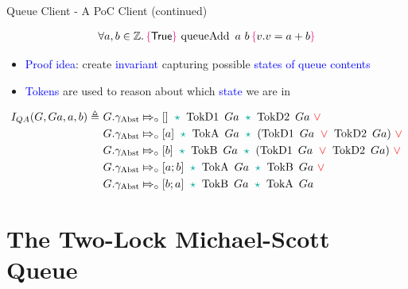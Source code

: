 \documentclass[9pt,xcolor={dvipsnames}]{beamer}
\newcommand{\queueAdd}{\operatorname{queueAdd}}
\newcommand{\QueueAddInvariant}{I_{QA}}
\newcommand{\Qg}{G}
\newcommand{\QAg}{Ga}
\newcommand{\gabst}{\gname_{\mathrm{Abst}}}
\newcommand{\TokDo}[1]{\operatorname{TokD1} ~ #1}
\newcommand{\TokDoQAg}{\TokDo{\QAg}}
\newcommand{\TokDt}[1]{\operatorname{TokD2} ~ #1}
\newcommand{\TokDtQAg}{\TokDt{\QAg}}
\newcommand{\TokA}[1]{\operatorname{TokA} ~ #1}
\newcommand{\TokAQAg}{\TokA{\QAg}}
\newcommand{\TokB}[1]{\operatorname{TokB} ~ #1}
\newcommand{\TokBQAg}{\TokB{\QAg}}
\newcommand{\abstractstatefullfrag}[2]{#1 \Mapsto_{\circ} #2}
\let\oldlor\lor
\renewcommand{\lor}{\begingroup \color{red} \oldlor \endgroup}
\let\oldstar\star
\renewcommand{\star}{\begingroup \color{Emerald} \oldstar \endgroup}
\begin{document}
\begin{frame}[fragile]{Queue Client - A PoC Client (continued)}
  \begin{lemma}\label{QueueSpecs:spec:queueadd}
    \setlength\abovedisplayskip{-8pt}
    \setlength\belowdisplayskip{2pt}
    \begin{align*}
      \All a, b \in \mathbb{Z} . \hoare{\TRUE}{\queueAdd \ a \ b}{v . v = a + b}
    \end{align*}
  \end{lemma}
  \pause
  \begin{itemize}
    \item \textcolor{blue}{Proof idea}: create \textcolor{blue}{invariant} capturing possible \textcolor{blue}{states of queue contents}
    \item \textcolor{blue}{Tokens} are used to reason about which \textcolor{blue}{state} we are in
  \end{itemize}
  \begin{definition}\label{QueueSpecs:queueadd:invariant}
    \setlength\abovedisplayskip{-8pt}
    \setlength\belowdisplayskip{2pt}
    \begin{align*}
      \QueueAddInvariant(\Qg, \QAg, a, b) \eqdef~
      &\abstractstatefullfrag{\Qg.\gabst}{[]}~\star~\TokDoQAg~\star~\TokDtQAg~\lor\\
      &\abstractstatefullfrag{\Qg.\gabst}{[a]}~\star~\TokAQAg~\star~(\TokDoQAg~\lor~\TokDtQAg)~\lor\\
      &\abstractstatefullfrag{\Qg.\gabst}{[b]}~\star~\TokBQAg~\star~(\TokDoQAg~\lor~\TokDtQAg)~\lor\\
      &\abstractstatefullfrag{\Qg.\gabst}{[a; b]}~\star~\TokAQAg~\star~\TokBQAg~\lor\\
      &\abstractstatefullfrag{\Qg.\gabst}{[b; a]}~\star~\TokBQAg~\star~\TokAQAg~
    \end{align*}
  \end{definition}
\end{frame}


\section{The Two-Lock Michael-Scott Queue}
\end{document}
